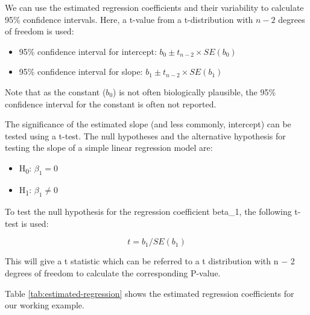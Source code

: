 \documentclass[
]{memoir}
\providecommand{\tightlist}{%
  \setlength{\itemsep}{0pt}\setlength{\parskip}{0pt}}
\begin{document}
We can use the estimated regression coefficients and their variability to calculate 95\% confidence intervals. Here, a t-value from a t-distribution with \(n - 2\) degrees of freedom is used:

\begin{itemize}
\tightlist
\item
  95\% confidence interval for intercept: \(b_0 \pm t_{n-2} \times SE(b_0)\)
\item
  95\% confidence interval for slope: \(b_1 \pm t_{n-2} \times SE(b_1)\)
\end{itemize}

Note that as the constant (\(b_0\)) is not often biologically plausible, the 95\% confidence interval for the constant is often not reported.

The significance of the estimated slope (and less commonly, intercept) can be tested using a t-test. The null hypotheses and the alternative hypothesis for testing the slope of a simple linear regression model are:

\begin{itemize}
\tightlist
\item
  H\textsubscript{0}: \(\beta_1 = 0\)
\item
  H\textsubscript{1}: \(\beta_1 \ne 0\)
\end{itemize}

To test the null hypothesis for the regression coefficient beta\_1, the following t-test is used:

\[t = b_1 /SE(b_1)\]

This will give a t statistic which can be referred to a t distribution with n − 2 degrees of freedom to calculate the corresponding P-value.

Table \ref{tab:estimated-regression} shows the estimated regression coefficients for our working example.

 
  \providecommand{\huxb}[2]{\arrayrulecolor[RGB]{#1}\global\arrayrulewidth=#2pt}
  \providecommand{\huxvb}[2]{\color[RGB]{#1}\vrule width #2pt}
  \providecommand{\huxtpad}[1]{\rule{0pt}{#1}}
  \providecommand{\huxbpad}[1]{\rule[-#1]{0pt}{#1}}
\end{document}
